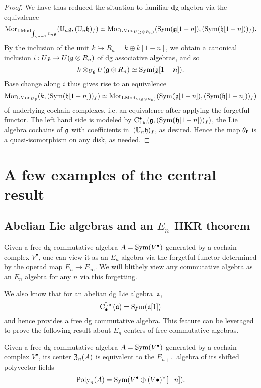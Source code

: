 \documentclass[11pt]{amsart}
\numberwithin{equation}{section}
\begin{document}
\begin{proof}
We have thus reduced the situation to familiar dg algebra via the equivalence
\[
{\rm Mor}_{{\rm LMod}_{\int_{S^{n-1}} \mathbb U_n\mathfrak g}}(\mathbb U_n \mathfrak g, (\mathbb U_n \mathfrak h)_f) 
\simeq 
{\rm Mor}_{{\rm LMod}_{U(\mathfrak g \otimes R_n)}} ({\rm Sym}(\mathfrak g[1-n]), ({\rm Sym}(\mathfrak h[1-n]))_f).
\]
By the inclusion of the unit $k \hookrightarrow R_n = k \oplus k[1-n]$,
we obtain a canonical inclusion $i: U\mathfrak g \to U(\mathfrak g \otimes R_n)$ of dg associative algebras,
and so
\[
k \otimes_{U\mathfrak g} U(\mathfrak g \otimes R_n) \simeq {\rm Sym}(\mathfrak g[1-n]).
\]
Base change along $i$ thus gives rise to an equivalence 
\[
{\rm Mor}_{{\rm LMod}_{U\mathfrak g}} (k, ({\rm Sym}(\mathfrak h[1-n]))_f) \simeq {\rm Mor}_{{\rm LMod}_{U(\mathfrak g \otimes R_n)}} ({\rm Sym}(\mathfrak g[1-n]), ({\rm Sym}(\mathfrak h[1-n]))_f)
\]
of underlying cochain complexes, i.e. an equivalence after applying the forgetful functor. 
The left hand side is modeled by ${\rm C}_{\rm Lie}^\bullet(\mathfrak g,({\rm Sym}(\mathfrak h[1-n]))_f)$, 
the Lie algebra cochains of $\mathfrak g$ with coefficients in~$(\mathbb U_n \mathfrak h)_f$, as desired.
Hence the map $\theta_{\bf f}$ is a quasi-isomorphism on any disk, as needed.
\end{proof}

\section{A few examples of the central result}

\subsection{Abelian Lie algebras and an $E_n$ HKR theorem}

Given a free dg commutative algebra $A = {\rm Sym}(V^\bullet)$ generated by a cochain complex $V^\bullet$,
one can view it as an $E_n$ algebra via the forgetful functor determined by the operad map $E_n \to E_\infty$.
We will blithely view any commutative algebra as an $E_n$ algebra for any $n$ via this forgetting.

We also know that for an abelian dg Lie algebra~${\frak a}$, 
\[
{\rm C}^{\rm Lie}_\bullet({\frak a}) = {\rm Sym}({\frak a}[1])
\]
and hence provides a free dg commutative algebra.
This feature can be leveraged to prove the following result about $E_n$-centers of free commutative algebras.

\begin{prp}
Given a free dg commutative algebra $A = {\rm Sym}(V^\bullet)$ generated by a cochain complex $V^\bullet$,
its center ${\frak Z}_n(A)$ is equivalent to the $E_{n+1}$ algebra of its shifted polyvector fields 
\[
{\rm Poly}_n(A) = {\rm Sym}(V^\bullet \oplus (V\bullet)^\vee[-n]).
\]
\end{prp}
\end{document}
